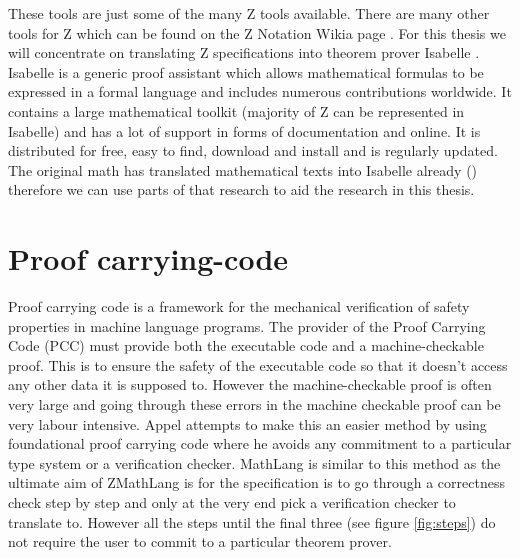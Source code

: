 These tools are just some of the many Z tools available. There are many other tools for Z which can be found on the Z Notation Wikia page \cite{zwikia}. For this thesis we will concentrate on translating Z specifications into theorem prover Isabelle \cite{isabelle}. Isabelle is a generic proof assistant which allows mathematical formulas to be expressed in a formal language and includes numerous contributions worldwide. It contains a large mathematical toolkit (majority of Z can be represented in Isabelle) and has a lot of support in forms of documentation and online. It is distributed for free, easy to find, download and install and is regularly updated. The original \gls{math} has translated mathematical texts into Isabelle already (\cite{mathintoisa}) therefore we can use parts of that research to aid the research in this thesis.

\section{Proof carrying-code}

Proof carrying code is a framework for the mechanical verification of safety properties in machine language programs. The provider of the Proof Carrying Code (PCC) must provide both the executable code and a machine-checkable proof. This is to ensure the safety of the executable code so that it doesn't access any other data it is supposed to. However the machine-checkable proof is often very large and going through these errors in the machine checkable proof can be very labour intensive. Appel \cite{fpcc} attempts to make this an easier method by using foundational proof carrying code where he avoids any commitment to a particular type system or a verification checker. MathLang is similar to this method as the ultimate aim of ZMathLang is for the specification is to go through a correctness check step by step and only at the very end pick a verification checker to translate to. However all the steps until the final three (see figure \ref{fig:steps}) do not require the user to commit to a particular theorem prover.

